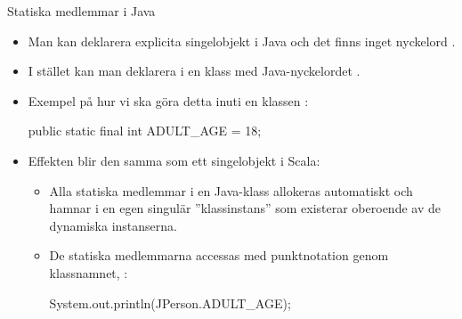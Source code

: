 \begin{Slide}{Statiska medlemmar i Java}
\begin{itemize}
\item Man kan  deklarera explicita singelobjekt i Java och det finns inget nyckelord .

\item I stället kan man deklarera  i en klass med Java-nyckelordet .

\item Exempel på hur vi ska göra detta inuti en klassen :

\begin{Code}[language=Java,basicstyle=\SlideFontSize{10}{12}\ttfamily\selectfont]
public static final int ADULT_AGE = 18;
\end{Code}

\item Effekten blir den samma som ett singelobjekt i Scala:
\begin{itemize}
\item Alla statiska medlemmar i en Java-klass allokeras automatiskt och hamnar i en egen singulär ''klassinstans'' som existerar oberoende av de dynamiska instanserna.
\item De statiska medlemmarna accessas med punktnotation genom klassnamnet,  :
\begin{Code}[language=Java,basicstyle=\SlideFontSize{11}{13}\ttfamily\selectfont]
System.out.println(JPerson.ADULT_AGE);
\end{Code}

\end{itemize}


\end{itemize}
\end{Slide}
  




